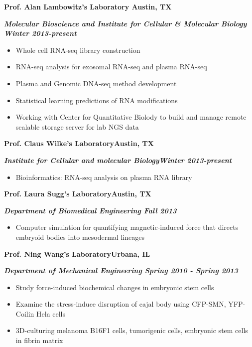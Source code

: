\documentclass[dvips,11pt]{article}
\begin{document}
\noindent \centerline{\bf Prof. Alan Lambowitz's Laboratory \hfill	Austin, TX}
\noindent \centerline{\textit{\textbf{Molecular Bioscience and Institute for Cellular \& Molecular Biology  \hfill Winter 2013-present}}}
\vspace{-2mm}
\begin{itemize} \itemsep1pt \parskip0pt 
	\setlength{\itemsep}{0pt}
	\item Whole cell RNA-seq library construction
	\item RNA-seq analysis for exosomal RNA-seq and plasma RNA-seq
	\item Plasma and Genomic DNA-seq method development
	\item Statistical learning predictions of RNA modifications
	\item Working with Center for Quantitative Biolody to build and manage remote scalable storage server for lab NGS data
\end{itemize}

\noindent \centerline{\bf Prof. Claus Wilke's Laboratory\hfill	Austin, TX}
\noindent \centerline{\textit {\textbf{Institute for Cellular and molecular Biology\hfill Winter 2013-present}}}
\vspace{-2mm}
\begin{itemize} \itemsep1pt \parskip0pt 
	\setlength{\itemsep}{0pt}
	\item Bioinformatics: RNA-seq analysis on plasma RNA library
\end{itemize}

\noindent \centerline{\bf Prof. Laura Sugg's Laboratory\hfill	Austin, TX}
\noindent \centerline{\textbf{\textit{Department of Biomedical Engineering \hfill Fall 2013}}}
\vspace{-2mm}
\begin{itemize} \itemsep1pt \parskip0pt 
	\setlength{\itemsep}{0pt}
	\item Computer simulation for quantifying magnetic-induced force that directs embryoid bodies into mesodermal lineages
\end{itemize}

\noindent \centerline{\bf Prof. Ning Wang's Laboratory\hfill Urbana, IL}
\noindent \centerline{\bf{\textit{Department of Mechanical Engineering \hfill Spring 2010 - Spring 2013} }}
\vspace{-2mm}
\begin{itemize} \itemsep1pt \parskip0pt 
	\setlength{\itemsep}{0pt}
	\item Study force-induced biochemical changes in embryonic stem cells
	\item Examine the stress-induce disruption of cajal body using CFP-SMN, YFP-Coilin Hela cells
	\item 3D-culturing melanoma B16F1 cells, tumorigenic cells, embryonic stem cells in fibrin matrix
\end{itemize}
\end{document}
